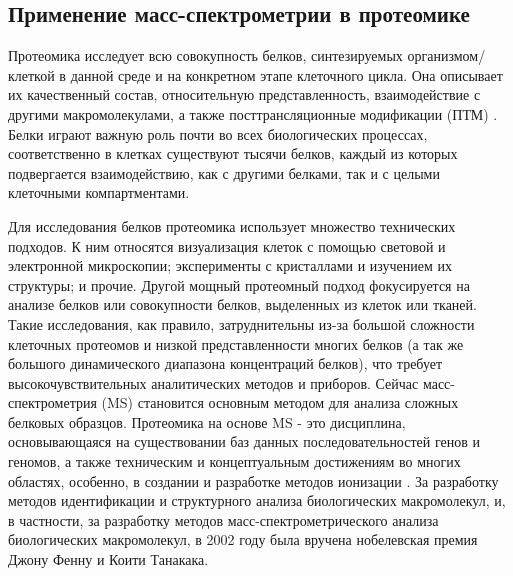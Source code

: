 \subsection{Применение масс-спектрометрии в протеомике}
Протеомика исследует всю совокупность белков, синтезируемых организмом/клеткой в данной среде и на конкретном этапе клеточного цикла. Она описывает их качественный состав, относительную представленность, взаимодействие с другими макромолекулами, а также посттрансляционные модификации (ПТМ) \cite{haekkinen2000cell, molloy2002proteomics, monteoliva2004differential}. Белки играют важную роль почти во всех биологических процессах, соответственно в клетках существуют тысячи белков, каждый из которых подвергается взаимодействию, как с другими белками, так и с целыми клеточными компартментами.

Для исследования белков протеомика использует множество технических подходов. К ним относятся визуализация клеток с помощью световой и электронной микроскопии; эксперименты с кристаллами и изучением их структуры; и прочие. Другой мощный протеомный подход фокусируется на анализе  белков или совокупности белков, выделенных из клеток или тканей. Такие исследования, как правило, затруднительны из-за большой сложности клеточных протеомов и низкой представленности многих белков (а так же большого динамического диапазона концентраций белков), что требует высокочувствительных аналитических методов и приборов. Сейчас масс-спектрометрия (MS) становится основным методом для анализа сложных белковых образцов. Протеомика на основе MS - это дисциплина, основывающаяся на существовании баз данных последовательностей генов и геномов, а также техническим и концептуальным достижениям во многих областях, особенно, в создании и разработке методов ионизации \cite{aebersold2003mass}. За разработку методов идентификации и структурного анализа биологических макромолекул, и, в частности, за разработку методов масс-спектрометрического анализа биологических макромолекул, в 2002 году была вручена нобелевская премия Джону Фенну и Коити Танакака.

